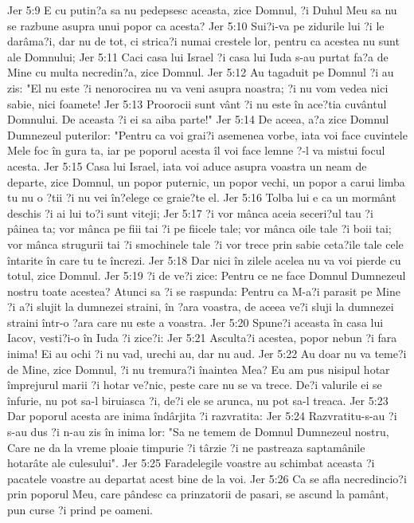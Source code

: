 Jer 5:9  E cu putin?a sa nu pedepsesc aceasta, zice Domnul, ?i Duhul Meu sa nu se razbune asupra unui popor ca acesta?
Jer 5:10  Sui?i-va pe zidurile lui ?i le darâma?i, dar nu de tot, ci strica?i numai crestele lor, pentru ca acestea nu sunt ale Domnului;
Jer 5:11  Caci casa lui Israel ?i casa lui Iuda s-au purtat fa?a de Mine cu multa necredin?a, zice Domnul.
Jer 5:12  Au tagaduit pe Domnul ?i au zis: "El nu este ?i nenorocirea nu va veni asupra noastra; ?i nu vom vedea nici sabie, nici foamete!
Jer 5:13  Proorocii sunt vânt ?i nu este în ace?tia cuvântul Domnului. De aceasta ?i ei sa aiba parte!"
Jer 5:14  De aceea, a?a zice Domnul Dumnezeul puterilor: "Pentru ca voi grai?i asemenea vorbe, iata voi face cuvintele Mele foc în gura ta, iar pe poporul acesta îl voi face lemne ?-l va mistui focul acesta.
Jer 5:15  Casa lui Israel, iata voi aduce asupra voastra un neam de departe, zice Domnul, un popor puternic, un popor vechi, un popor a carui limba tu nu o ?tii ?i nu vei în?elege ce graie?te el.
Jer 5:16  Tolba lui e ca un mormânt deschis ?i ai lui to?i sunt viteji;
Jer 5:17  ?i vor mânca aceia seceri?ul tau ?i pâinea ta; vor mânca pe fiii tai ?i pe fiicele tale; vor mânca oile tale ?i boii tai; vor mânca strugurii tai ?i smochinele tale ?i vor trece prin sabie ceta?ile tale cele întarite în care tu te încrezi.
Jer 5:18  Dar nici în zilele acelea nu va voi pierde cu totul, zice Domnul.
Jer 5:19  ?i de ve?i zice: Pentru ce ne face Domnul Dumnezeul nostru toate acestea? Atunci sa ?i se raspunda: Pentru ca M-a?i parasit pe Mine ?i a?i slujit la dumnezei straini, în ?ara voastra, de aceea ve?i sluji la dumnezei straini într-o ?ara care nu este a voastra.
Jer 5:20  Spune?i aceasta în casa lui Iacov, vesti?i-o în Iuda ?i zice?i:
Jer 5:21  Asculta?i acestea, popor nebun ?i fara inima! Ei au ochi ?i nu vad, urechi au, dar nu aud.
Jer 5:22  Au doar nu va teme?i de Mine, zice Domnul, ?i nu tremura?i înaintea Mea? Eu am pus nisipul hotar împrejurul marii ?i hotar ve?nic, peste care nu se va trece. De?i valurile ei se înfurie, nu pot sa-l biruiasca ?i, de?i ele se arunca, nu pot sa-l treaca.
Jer 5:23  Dar poporul acesta are inima îndârjita ?i razvratita:
Jer 5:24  Razvratitu-s-au ?i s-au dus ?i n-au zis în inima lor: "Sa ne temem de Domnul Dumnezeul nostru, Care ne da la vreme ploaie timpurie ?i târzie ?i ne pastreaza saptamânile hotarâte ale culesului".
Jer 5:25  Faradelegile voastre au schimbat aceasta ?i pacatele voastre au departat acest bine de la voi.
Jer 5:26  Ca se afla necredincio?i prin poporul Meu, care pândesc ca prinzatorii de pasari, se ascund la pamânt, pun curse ?i prind pe oameni.
